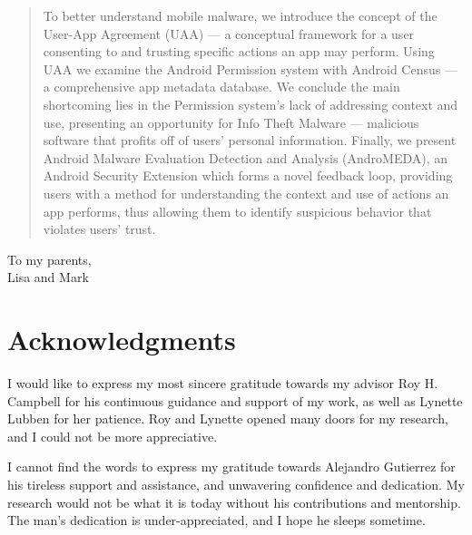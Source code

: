\documentclass[edeposit,10pt,fullpage]{uiucthesis2009}
\begin{document}
\begin{abstract}
To better understand mobile malware, we introduce the concept of the User-App Agreement (UAA) --- a conceptual framework for a user consenting to and trusting specific actions an app may perform. Using UAA we examine the Android Permission system with Android Census --- a comprehensive app metadata database. We conclude the main shortcoming lies in the Permission system's lack of addressing context and use, presenting an opportunity for Info Theft Malware --- malicious software that profits off of users' personal information. Finally, we present Android Malware Evaluation Detection and Analysis (AndroMEDA), an Android Security Extension which forms a novel feedback loop, providing users with a method for understanding the context and use of actions an app performs, thus allowing them to identify suspicious behavior that violates users' trust.






\end{abstract}

\begin{dedication}
To my parents,\\ Lisa and Mark
\end{dedication}

\chapter*{Acknowledgments}

I would like to express my most sincere gratitude towards my advisor Roy H. Campbell for his continuous guidance and support of my work, as well as Lynette Lubben for her patience. Roy and Lynette opened many doors for my research, and I could not be more appreciative.

I cannot find the words to express my gratitude towards Alejandro Gutierrez for his tireless support and assistance, and unwavering confidence and dedication. My research would not be what it is today without his contributions and mentorship. The man's dedication is under-appreciated, and I hope he sleeps sometime. 
\end{document}
